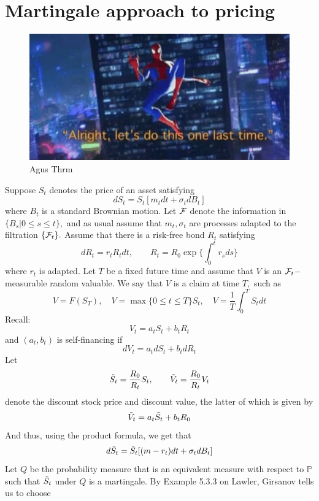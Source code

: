 \documentclass[oneside]{book}
\newcommand{\bbP}{\mathbb{P}}
\begin{document}
\section{Martingale approach to pricing}
\begin{figure}[h!]
    \centering
    \includegraphics[width=0.5\linewidth]{REU-2024//Images/SDE.jpg}
    \caption{Agus Thrm}
    \label{fig:enter-label}
\end{figure}

Suppose $S_t$ denotes the price of an asset satisfying 
\[dS_t = S_t[m_t dt + \sigma_t dB_t]\]
where $B_t$ is a standard Brownian motion. Let $\mathcal{F}$ denote the information in $\{B_s | 0\leq s \leq t\},$ and as usual assume that $m_t, \sigma_t$ are processes adapted to the filtration $\{\mathcal{F}_t\}.$ Assume that there is a risk-free bond $R_t$ satisfying 
\[dR_t = r_tR_tdt, \qquad R_t = R_0 \exp\{\int_0^t r_s ds\}\]
where $r_t$ is adapted. Let $T$ be a fixed future time and assume that $V$ is an $\mathcal{F}_t-$measurable random valuable. We say that $V$ is a claim at time $T,$ such as 
\[V = F(S_T), \quad V = \max\{0\leq t\leq T\}S_t, \quad V = \frac{1}{T}\int_0^T S_t dt\]
Recall:
\[V_t = a_tS_t + b_tR_t\]
and $(a_t,b_t)$ is self-financing if
\[dV_t = a_tdS_t + b_tdR_t\]
Let 
\[\Tilde{S}_t = \frac{R_0}{R_t}S_t, \qquad \Tilde{V}_t = \frac{R_0}{R_t}V_t\]
denote the discount stock price and discount value, the latter of which is given by 
\[\Tilde{V}_t = a_t \Tilde{S}_t + b_tR_0\]
And thus, using the product formula, we get that 
\[d\Tilde{S}_t = \Tilde{S}_t[(m-r_t)dt + \sigma_tdB_t]\]
Let $Q$ be the probability measure that is an equivalent measure with respect to $\bbP$ such that $\Tilde{S}_t$ under $Q$ is a martingale. By Example 5.3.3 on Lawler, Girsanov tells us to choose
\end{document}
